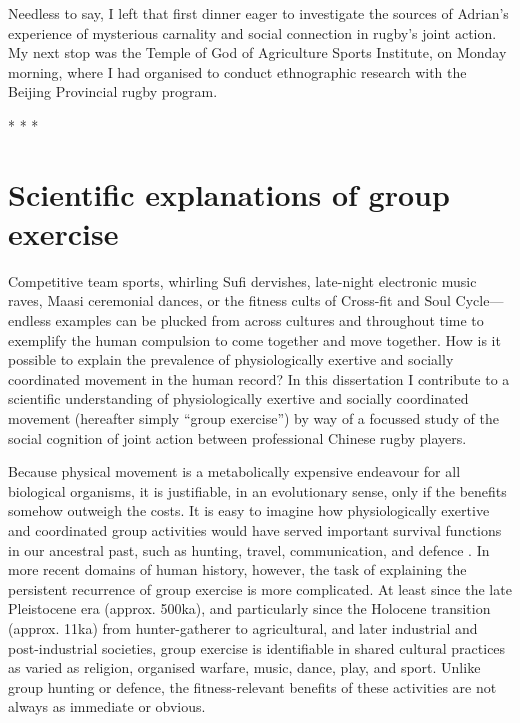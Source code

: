 Needless to say, I left that first dinner eager to investigate the sources of Adrian's experience of mysterious carnality and social connection in rugby's joint action.  My next stop was the Temple of God of Agriculture Sports Institute, on Monday morning, where I had organised to conduct ethnographic research with the Beijing Provincial rugby program.

                            \begin{center}
                              * * *
                            \end{center}

\section{Scientific explanations of group exercise}

Competitive team sports, whirling Sufi dervishes, late-night electronic music raves, Maasi ceremonial dances, or the fitness cults of Cross-fit and Soul Cycle---endless examples can be plucked from across cultures and throughout time to exemplify the human compulsion to come together and move together.  How is it possible to explain the prevalence of physiologically exertive and socially coordinated movement in the human record?  In this dissertation I contribute to a scientific understanding of physiologically exertive and socially coordinated movement (hereafter simply ``group exercise'') by way of a focussed study of the social cognition of joint action between professional Chinese rugby players.




Because physical movement is a metabolically expensive endeavour for all biological organisms, it is justifiable, in an evolutionary sense, only if the benefits somehow outweigh the costs.  It is easy to imagine how physiologically exertive and coordinated group activities would have served important survival functions in our ancestral past, such as hunting, travel, communication, and defence \citep{Sands2010}.  In more recent domains of human history, however, the task of explaining the persistent recurrence of group exercise is  more complicated.  At least since the late Pleistocene era (approx. 500ka), and particularly since the Holocene transition (approx. 11ka) from hunter-gatherer to agricultural, and later industrial and post-industrial societies, group exercise is identifiable in shared cultural practices as varied as religion, organised warfare, music, dance, play, and sport.  Unlike group hunting or defence, the fitness-relevant benefits of these activities are not always as immediate or obvious.


